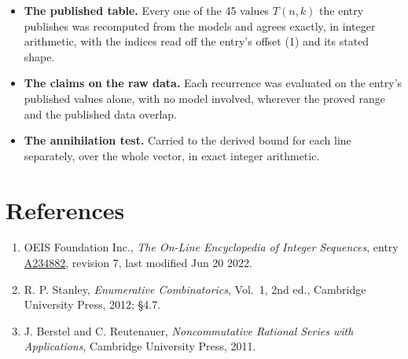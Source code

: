 \documentclass[11pt]{article}
\theoremstyle{definition}
\begin{document}
\begin{itemize}

\item {\bfseries The published table.} Every one of the 45 values $T(n,k)$ the entry publishes was recomputed from the models and agrees exactly, in integer arithmetic, with the indices read off the entry's offset (1) and its stated shape.

\item {\bfseries The claims on the raw data.} Each recurrence was evaluated on the entry's published values alone, with no model involved, wherever the proved range and the published data overlap.

\item {\bfseries The annihilation test.} Carried to the derived bound for each line separately, over the whole vector, in exact integer arithmetic.

\end{itemize}

\section{References}

\begin{enumerate}

\item OEIS Foundation Inc., \emph{The On-Line Encyclopedia of Integer Sequences}, entry \href{https://oeis.org/A234882}{A234882}, revision 7, last modified Jun 20 2022.

\item R. P. Stanley, \emph{Enumerative Combinatorics}, Vol.~1, 2nd ed., Cambridge University Press, 2012; \S4.7.

\item J. Berstel and C. Reutenauer, \emph{Noncommutative Rational Series with Applications}, Cambridge University Press, 2011.

\end{enumerate}
\end{document}

